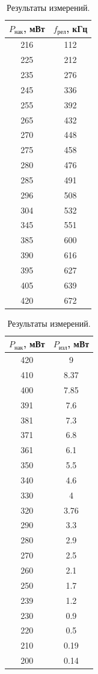 \documentclass[12pt]{article}
\begin{document}
	\begin{table}[tb]
	\begin{center}
	 	\begin{tabular}{|c|c|}
	 		\hline
	 		$P_\text{нак}$, мВт & $f_\text{рел}$, кГц\\
	 		\hline
			216 &	112\\
			225 &	212\\
			235 &	276\\
			245 &	336\\
			255 &	392\\
			265 &	432\\
			270 &	448\\
			275 &	458\\
			280 &	476\\
			285 &	491\\
			296 &	508\\
			304 &	532\\
			345 &	551\\
			385 &	600\\
			390 &	616\\
			395 &	627\\
			405 &	639\\
			420 &	672\\
			\hline
	 	\end{tabular}
	 	\begin{tabular}{|c|c|}
	 		\hline
	 		$P_\text{нак}$, мВт & $P_\text{изл}$, мВт\\
	 		\hline
	 		420 &	9\\
			410 &	8.37\\
			400 &	7.85\\
			391 &	7.6\\
			381 &	7.3\\
			371 &	6.8\\
			361 &	6.1\\
			350 &	5.5\\
			340 &	4.6\\
			330 &	4\\
			320 &	3.76\\
			290 &	3.3\\
			280 &	2.9\\
			270 &	2.5\\
			260 &	2.1\\
			250 &	1.7\\
			239 &	1.2\\
			230 &	0.9\\
			220 &	0.5\\
			210 &	0.19\\
			200 &	0.14\\
			\hline
	 	\end{tabular}
	\end{center}
	\caption{Результаты измерений.}
	\label{tab}
	\end{table}
\end{document}
